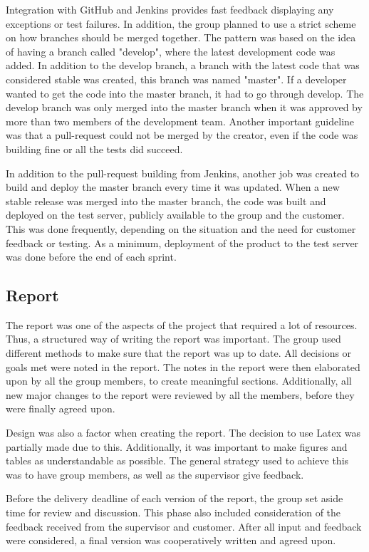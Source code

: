 Integration with GitHub and Jenkins provides fast feedback displaying any exceptions or test failures. In addition, the group planned to use a strict scheme on how branches should be merged together. The pattern was based on the idea of having a branch called "develop", where the latest development code was added. In addition to the develop branch, a branch with the latest code that was considered stable was created, this branch was named "master". If a developer wanted to get the code into the master branch, it had to go through develop. The develop branch was only merged into the master branch when it was approved by more than two members of the development team. Another important guideline was that a pull-request could not be merged by the creator, even if the code was building fine or all the tests did succeed. 

In addition to the pull-request building from Jenkins, another job was created to build and deploy the master branch every time it was updated. When a new stable release was merged into the master branch, the code was built and deployed on the test server, publicly available to the group and the customer. This was done frequently, depending on the situation and the need for customer feedback or testing. As a minimum, deployment of the product to the test server was done before the end of each sprint.

\subsection{Report}
\label{subsec:process_and_methodology-process_methodology-report}

The report was one of the aspects of the project that required a lot of resources. Thus, a structured way of writing the report was important. The group used different methods to make sure that the report was up to date. All decisions or goals met were noted in the report. The notes in the report were then elaborated upon by all the group members, to create meaningful sections. Additionally, all new major changes to the report were reviewed by all the members, before they were finally agreed upon. 

Design was also a factor when creating the report. The decision to use Latex was partially made due to this. Additionally, it was important to make figures and tables as understandable as possible. The general strategy used to achieve this was to have group members, as well as the supervisor give feedback.

Before the delivery deadline of each version of the report, the group set aside time for review and discussion. This phase also included consideration of the feedback received from the supervisor and customer. After all input and feedback were considered, a final version was cooperatively written and agreed upon.

